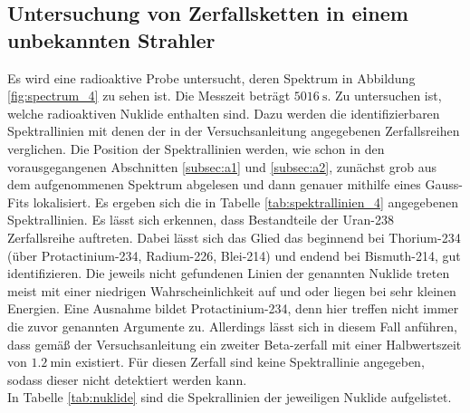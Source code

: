 \subsection{Untersuchung von Zerfallsketten in einem unbekannten Strahler }
\label{subsec:a4}
Es wird eine radioaktive Probe untersucht, deren Spektrum in Abbildung \ref{fig:spectrum_4} zu sehen ist. Die Messzeit beträgt $\SI{5016}{\second}$.
Zu untersuchen ist, welche radioaktiven Nuklide enthalten sind. Dazu werden die identifizierbaren Spektrallinien
mit denen der in der Versuchsanleitung \cite{sample} angegebenen Zerfallsreihen verglichen.  Die Position
der Spektrallinien werden, wie schon in den vorausgegangenen Abschnitten \ref{subsec:a1} und \ref{subsec:a2}, zunächst
grob aus dem aufgenommenen Spektrum abgelesen und dann genauer mithilfe eines Gauss-Fits lokalisiert.
Es ergeben sich die in Tabelle \ref{tab:spektrallinien_4}  angegebenen Spektrallinien. Es lässt sich erkennen, dass
Bestandteile der Uran-238 Zerfallsreihe auftreten. Dabei lässt sich das Glied das beginnend bei Thorium-234 (über Protactinium-234, Radium-226,
Blei-214) und endend bei Bismuth-214, gut identifizieren. Die jeweils nicht gefundenen Linien der genannten Nuklide
treten meist mit einer niedrigen Wahrscheinlichkeit auf und oder liegen bei sehr kleinen Energien. Eine Ausnahme bildet
Protactinium-234, denn hier treffen nicht immer die zuvor genannten Argumente zu. Allerdings lässt sich in diesem Fall anführen,
dass gemäß der Versuchsanleitung \cite{sample} ein zweiter Beta-zerfall mit einer Halbwertszeit von $\SI{1,2}{\minute}$ existiert. Für diesen Zerfall sind keine Spektrallinie angegeben, sodass dieser nicht detektiert werden kann.\\
In Tabelle \ref{tab:nuklide} sind die Spekrallinien der jeweiligen Nuklide aufgelistet.


